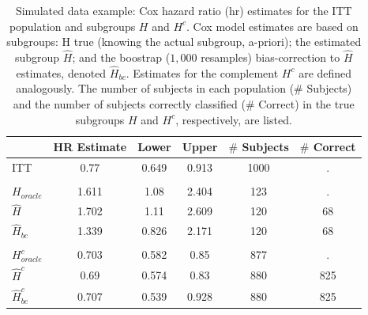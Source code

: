 \documentclass[smallextended]{svjour3}
\begin{document}
\begin{table}

\caption{\label{tab:simex_tab}\label{tab:simex} Simulated data example: Cox hazard ratio (hr) estimates for the ITT population and subgroups $H$ and $H^{c}$.
Cox model estimates are based on subgroups: H true (knowing the actual subgroup, a-priori); the estimated subgroup $\hat{H}$; and 
the boostrap ($1,000$ resamples) bias-correction to $\hat{H}$ estimates, denoted $\hat{H}_{bc}$.  Estimates for the complement $H^{c}$ are defined analogously.
The number of subjects in each population ($\#$ Subjects) and the number of subjects correctly classified ($\#$ Correct) in the true subgroups $H$ and $H^{c}$, respectively, are listed.}
\centering
\fontsize{9}{11}\selectfont
\begin{tabular}[t]{lccccc}
\toprule
  & HR Estimate & Lower & Upper & $\#$ Subjects & $\#$ Correct\\
\midrule
ITT & 0.77 & 0.649 & 0.913 & 1000 & .\\
\addlinespace[0.3em]
\multicolumn{6}{l}{\textbf{H subgroup estimates}}\\
\hspace{1em}$H_{oracle}$ & 1.611 & 1.08 & 2.404 & 123 & .\\
\hspace{1em}$\hat{H}$ & 1.702 & 1.11 & 2.609 & 120 & 68\\
\hspace{1em}$\hat{H}_{bc}$ & 1.339 & 0.826 & 2.171 & 120 & 68\\
\addlinespace[0.3em]
\multicolumn{6}{l}{\textbf{H-complement subgroup estimates}}\\
\hspace{1em}$H^{c}_{oracle}$ & 0.703 & 0.582 & 0.85 & 877 & .\\
\hspace{1em}$\hat{H}^{c}$ & 0.69 & 0.574 & 0.83 & 880 & 825\\
\hspace{1em}$\hat{H}^{c}_{bc}$ & 0.707 & 0.539 & 0.928 & 880 & 825\\
\bottomrule
\end{tabular}
\end{table}





\end{document}

